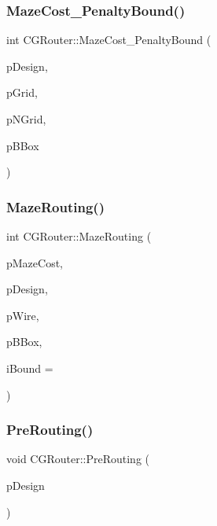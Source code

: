 \subsubsection{\texorpdfstring{MazeCost\_PenaltyBound()}{MazeCost\_PenaltyBound()}}
{\footnotesize\ttfamily int C\+G\+Router\+::\+Maze\+Cost\+\_\+\+Penalty\+Bound (\begin{DoxyParamCaption}\item[{\mbox{\hyperlink{classCDesign}{C\+Design}} $\ast$}]{p\+Design,  }\item[{\mbox{\hyperlink{classCGrid}{C\+Grid}} $\ast$}]{p\+Grid,  }\item[{\mbox{\hyperlink{classCGrid}{C\+Grid}} $\ast$}]{p\+N\+Grid,  }\item[{\mbox{\hyperlink{classCBBox}{C\+B\+Box}} $\ast$}]{p\+B\+Box }\end{DoxyParamCaption})\hspace{0.3cm}{\ttfamily [static]}}

\mbox{\label{classCGRouter_a4bbedf7ca84154f7c153874fb979c068}} 
\subsubsection{\texorpdfstring{MazeRouting()}{MazeRouting()}}
{\footnotesize\ttfamily int C\+G\+Router\+::\+Maze\+Routing (\begin{DoxyParamCaption}\item[{\mbox{\hyperlink{GRouter_8h_a7bce1c983b0974505feefa8727066acb}{F\+P\+\_\+\+M\+A\+Z\+E\+C\+O\+ST}} $\ast$}]{p\+Maze\+Cost,  }\item[{\mbox{\hyperlink{classCDesign}{C\+Design}} $\ast$}]{p\+Design,  }\item[{\mbox{\hyperlink{classCWire}{C\+Wire}} $\ast$}]{p\+Wire,  }\item[{\mbox{\hyperlink{classCBBox}{C\+B\+Box}} $\ast$}]{p\+B\+Box,  }\item[{int}]{i\+Bound = {} }\end{DoxyParamCaption})\hspace{0.3cm}{\ttfamily [static]}}

\mbox{\label{classCGRouter_aef04c6783171f5e9582e7d24b8966a07}} 
\subsubsection{\texorpdfstring{PreRouting()}{PreRouting()}}
{\footnotesize\ttfamily void C\+G\+Router\+::\+Pre\+Routing (\begin{DoxyParamCaption}\item[{\mbox{\hyperlink{classCDesign}{C\+Design}} $\ast$}]{p\+Design }\end{DoxyParamCaption})\hspace{0.3cm}{\ttfamily [static]}}

